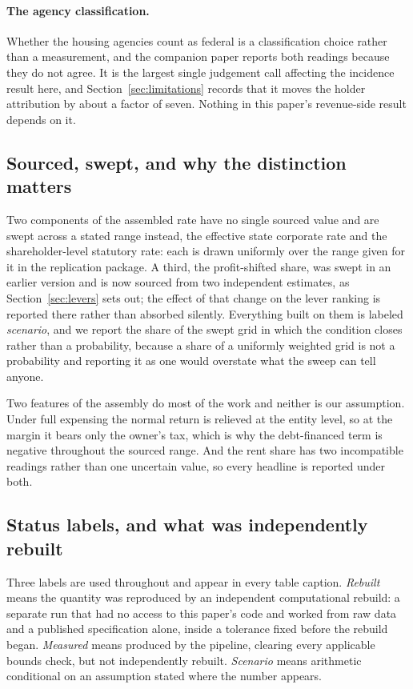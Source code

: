 \paragraph{The agency classification.} Whether the housing agencies count as federal is a
classification choice rather than a measurement, and the companion paper reports both readings
because they do not agree. It is the largest single judgement call affecting the incidence result
here, and Section~\ref{sec:limitations} records that it moves the holder attribution by about a
factor of seven. Nothing in this paper's revenue-side result depends on it.

\subsection{Sourced, swept, and why the distinction matters}

Two components of the assembled rate have no single sourced value and are swept across a stated
range instead, the effective state corporate rate and the shareholder-level statutory rate: each
is drawn uniformly over the range given for it in the replication package. A third, the
profit-shifted share, was swept in an earlier version and is now sourced from two independent
estimates, as Section~\ref{sec:levers} sets out; the effect of that change on the lever ranking
is reported there rather than absorbed silently.
Everything built on them is labeled \emph{scenario}, and we report the share of the swept grid
in which the condition closes rather than a probability, because a share of a uniformly weighted
grid is not a probability and reporting it as one would overstate what the sweep can tell anyone.

Two features of the assembly do most of the work and neither is our assumption. Under full
expensing the normal return is relieved at the entity level, so at the margin it bears only the
owner's tax, which is why the debt-financed term is negative throughout the sourced range. And
the rent share has two incompatible readings rather than one uncertain value, so every headline
is reported under both.

\subsection{Status labels, and what was independently rebuilt}
\label{sec:rebuild}

Three labels are used throughout and appear in every table caption. \emph{Rebuilt} means the
quantity was reproduced by an independent computational rebuild: a separate run that had no
access to this paper's code and worked from raw data and a published specification alone, inside
a tolerance fixed before the rebuild began. \emph{Measured} means produced by the pipeline,
clearing every applicable bounds check, but not independently rebuilt. \emph{Scenario} means
arithmetic conditional on an assumption stated where the number appears.

